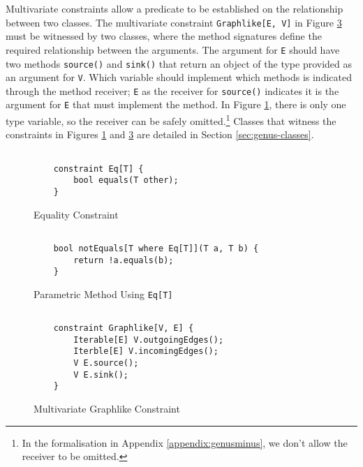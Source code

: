 Multivariate constraints allow a predicate to be established on the relationship between two classes. The multivariate constraint \texttt{Graphlike[E, V]} in Figure \ref{fig:graph-constraint} must be witnessed by two classes, where the method signatures define the required relationship between the arguments. The argument for \texttt{E} should have two methods \texttt{source()} and \texttt{sink()} that return an object of the type provided as an argument for \texttt{V}. Which variable should implement which methods is indicated through the method receiver; \texttt{E} as the receiver for \texttt{source()} indicates it is the argument for \texttt{E} that must implement the method. In Figure \ref{fig:eq-constraint}, there is only one type variable, so the receiver can be safely omitted.\footnote{In the formalisation in Appendix \ref{appendix:genusminus}, we don't allow the receiver to be omitted.} Classes that witness the constraints in Figures \ref{fig:eq-constraint} and \ref{fig:graph-constraint} are detailed in Section \ref{sec:genus-classes}. \\

\begin{figure}[h]
    \centering
    \begin{verbatim}
    
    constraint Eq[T] {
        bool equals(T other);
    }   
    \end{verbatim}
    \caption{Equality Constraint}
    \label{fig:eq-constraint}
\end{figure}

\begin{figure}[h]
    \centering
    \begin{verbatim}
    
    bool notEquals[T where Eq[T]](T a, T b) {
        return !a.equals(b);
    }
    \end{verbatim}
    \caption{Parametric Method Using \texttt{Eq[T]}}
    \label{fig:eq-method}
\end{figure}

\begin{figure}[h]
    \centering
    \begin{verbatim}
    
    constraint Graphlike[V, E] {
        Iterable[E] V.outgoingEdges();
        Iterble[E] V.incomingEdges();
        V E.source();
        V E.sink();
    }
    \end{verbatim}
    \caption{Multivariate Graphlike Constraint}
    \label{fig:graph-constraint}
\end{figure}

